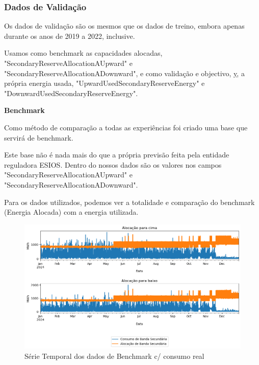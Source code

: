 \subsubsection{Dados de Validação}
Os dados de validação são os mesmos que os dados de treino, embora apenas durante os anos de 2019 a 2022, inclusive.\par
Usamos como benchmark as capacidades alocadas, "SecondaryReserveAllocationAUpward" e "SecondaryReserveAllocationADownward", e como validação e objectivo, \hyperref[se:metneuralnet]{y}, a própria energia usada, "UpwardUsedSecondaryReserveEnergy" e "DownwardUsedSecondaryReserveEnergy".

\textbf{Benchmark}

Como método de comparação a todas as experiências foi criado uma base que servirá de benchmark.\par
Este base não é nada mais do que a própria previsão feita pela entidade reguladora \gls{ESIOS}. Dentro do nossos dados são os valores nos campos "SecondaryReserveAllocationAUpward" e "SecondaryReserveAllocationADownward".\par
Para os dados utilizados, podemos ver a totalidade e comparação do benchmark (Energia Alocada) com a energia utilizada.\par

\begin{figure}[H]
    \centering
    \includegraphics[width=\textwidth]{plots/benchmark_alocacoes_validacao.png}
    \caption{Série Temporal dos dados de Benchmark c/ consumo real}
    \label{fig:benchmarktimeseries}
\end{figure}

